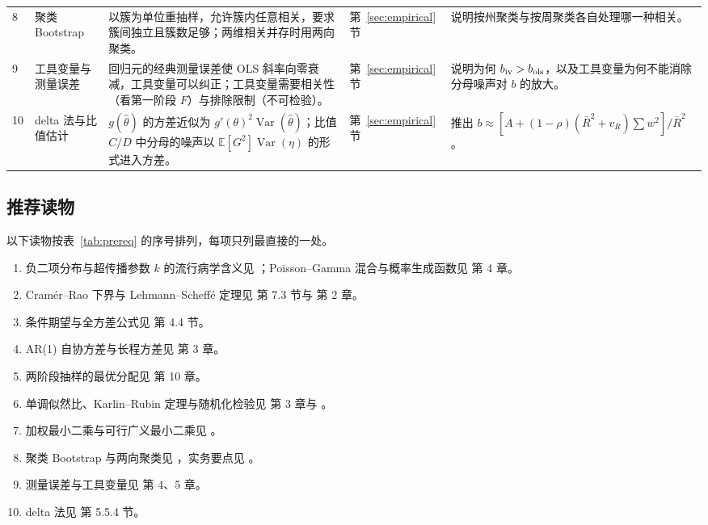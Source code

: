 \begin{table}[!tbp]
\begin{tabular}{L{0.3cm}L{2.0cm}L{5.8cm}L{1.5cm}L{4.4cm}}
8 & 聚类 Bootstrap & 以簇为单位重抽样，允许簇内任意相关，要求簇间独立且簇数足够；两维相关并存时用两向聚类。 & 第~\ref{sec:empirical} 节 & 说明按州聚类与按周聚类各自处理哪一种相关。 \\
9 & 工具变量与测量误差 & 回归元的经典测量误差使 OLS 斜率向零衰减，工具变量可以纠正；工具变量需要相关性（看第一阶段 $F$）与排除限制（不可检验）。 & 第~\ref{sec:empirical} 节 & 说明为何 $b_{\rm iv}>b_{\rm ols}$，以及工具变量为何不能消除分母噪声对 $b$ 的放大。 \\
10 & delta 法与比值估计 & $g(\hat\theta)$ 的方差近似为 $g'(\theta)^2\operatorname{Var}(\hat\theta)$；比值 $C/D$ 中分母的噪声以 $\mathbb{E}[G^2]\operatorname{Var}(\eta)$ 的形式进入方差。 & 第~\ref{sec:empirical} 节 & 推出 $b\approx[A+(1-\rho)(\bar R^2+v_R)\sum w^2]/\bar R^2$。 \\
\bottomrule
\end{tabular}
\end{table}

\subsection{推荐读物}

以下读物按表~\ref{tab:prereq} 的序号排列，每项只列最直接的一处。

\begin{enumerate}
\item 负二项分布与超传播参数 $k$ 的流行病学含义见 \citet{lloydsmith2005superspreading}；Poisson--Gamma 混合与概率生成函数见 \citet{casella2002statistical} 第 4 章。
\item Cram\'er--Rao 下界与 Lehmann--Scheff\'e 定理见 \citet{casella2002statistical} 第 7.3 节与 \citet{lehmann1998point} 第 2 章。
\item 条件期望与全方差公式见 \citet{casella2002statistical} 第 4.4 节。
\item AR(1) 自协方差与长程方差见 \citet{hamilton1994time} 第 3 章。
\item 两阶段抽样的最优分配见 \citet{cochran1977sampling} 第 10 章。
\item 单调似然比、Karlin--Rubin 定理与随机化检验见 \citet{lehmann2005testing} 第 3 章与 \citet{karlin1956theory}。
\item 加权最小二乘与可行广义最小二乘见 \citet{wooldridge2010econometric}。
\item 聚类 Bootstrap 与两向聚类见 \citet{cameron2008bootstrap,cameron2011robust}，实务要点见 \citet{cameron2015practitioner}。
\item 测量误差与工具变量见 \citet{wooldridge2010econometric} 第 4、5 章。
\item delta 法见 \citet{casella2002statistical} 第 5.5.4 节。
\end{enumerate}

